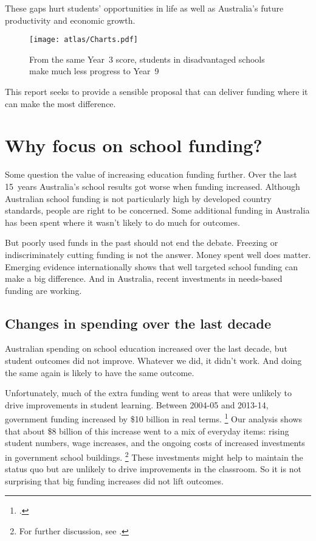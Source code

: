 \documentclass{grattan}
\begin{document}
These gaps hurt students' opportunities in life as well as Australia's future productivity and economic growth.

\begin{figure}
\caption{From the same Year~3 score, students in disadvantaged schools make much less progress to Year~9}\label{fig:widening-gaps}


\texttt{[image: atlas/Charts.pdf]}

\end{figure}


This report seeks to provide a sensible proposal that can deliver funding where it can make the most difference.

\section{Why focus on school funding?}\label{sec:why-focus-on-school-funding}

Some question the value of increasing education funding further. Over the last 15~years Australia's school results got worse when funding increased.
Although Australian school funding is not particularly high by developed country standards, people are right to be concerned.
Some additional funding in Australia has been spent where it wasn't likely to do much for outcomes.

But poorly used funds in the past should not end the debate.
Freezing or indiscriminately cutting funding is not the answer.
Money spent well does matter.
Emerging evidence internationally shows that well targeted school funding can make a big difference.
And in Australia, recent investments in needs-based funding are working.

\subsection{Changes in spending over the last decade }\label{subsec:changes-in-spending-over-the-last-decade}
Australian spending on school education increased over the last decade, but student outcomes did not improve.
Whatever we did, it didn't work. And doing the same again is likely to have the same outcome.

Unfortunately, much of the extra funding went to areas that were unlikely to drive improvements in student learning. Between 2004-05 and 2013-14, government funding increased by \$10 billion in real terms.%
\footcite{Commission2016NationalEducationEvidence} Our analysis shows that about \$8 billion of this increase went to a mix of everyday items: rising student numbers, wage increases, and the ongoing costs of increased investments in government school buildings.%
\footnote{For further discussion, see \textcite{Goss2016SchoolFundingRose}.}
These investments might help to maintain the status quo but are unlikely to drive improvements in the classroom.
So it is not surprising that big funding increases did not lift outcomes.
\end{document}
